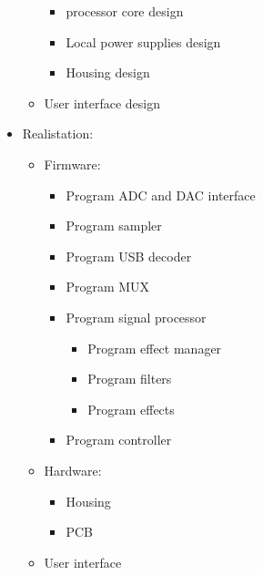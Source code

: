 \begin{itemize}
\begin{itemize}
\begin{itemize}
            \item processor core design
            \item Local power supplies design
            \item Housing design
        \end{itemize}
        \item User interface design
    \end{itemize}
    \item Realistation:
    \begin{itemize}
        \setlength\itemsep{-0.2em}
        \item Firmware:
        \begin{itemize}
            \setlength\itemsep{-0.2em}
            \item Program ADC and DAC interface
            \item Program sampler
            \item Program USB decoder
            \item Program MUX
            \item Program signal processor
            \begin{itemize}
                \setlength\itemsep{-0.2em}
                \item Program effect manager
                \item Program filters
                \item Program effects
            \end{itemize}
            \item Program controller
        \end{itemize}
        \item Hardware:
        \begin{itemize}
            \setlength\itemsep{-0.2em}
            \item Housing
            \item PCB
        \end{itemize}
        \item User interface
    \end{itemize}
\end{itemize}